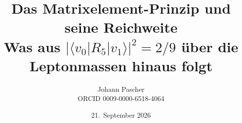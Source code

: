 \documentclass[11pt,a4paper]{report}
\title{Das Matrixelement-Prinzip und seine Reichweite\\[0.5em]\large Was aus $|\langle v_0|R_5|v_1\rangle|^2 = 2/9$ über die Leptonmassen hinaus folgt}
\date{21.~September 2026}
\author{Johann Pascher\\\small ORCID 0009-0000-6518-4064}
\begin{document}
\renewcommand{\thechapter}{}
\renewcommand{\thesection}{\arabic{section}}
\maketitle
\tableofcontents

\end{document}
